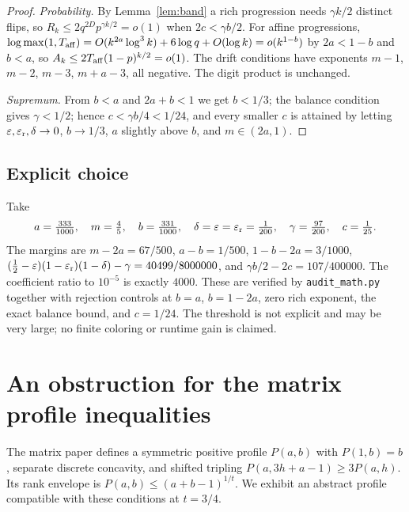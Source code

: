 \documentclass[11pt]{article}
\begin{document}
\begin{proof}
\emph{Probability.} By Lemma~\ref{lem:band} a rich progression needs
$\gamma k/2$ distinct flips, so
$R_k\le2q^{2D}p^{\gamma k/2}=o(1)$ when $2c<\gamma b/2$.
For affine progressions,
$\log\max(1,T_{\rm aff})=O(k^{2a}\log^3k)+6\log q+O(\log k)=o(k^{1-b})$
by $2a<1-b$ and $b<a$, so $A_k\le2T_{\rm aff}(1-p)^{k/2}=o(1)$.
The drift conditions have exponents $m-1$, $m-2$, $m-3$, $m+a-3$, all
negative. The digit product is unchanged.

\emph{Supremum.} From $b<a$ and $2a+b<1$ we get $b<1/3$; the balance
condition gives $\gamma<1/2$; hence $c<\gamma b/4<1/24$, and every
smaller $c$ is attained by letting $\varepsilon,\varepsilon_{\rm r},\delta\to0$,
$b\to1/3$, $a$ slightly above $b$, and $m\in(2a,1)$.
\end{proof}

\subsection{Explicit choice}
Take
\[
 a=\tfrac{333}{1000},\quad m=\tfrac45,\quad b=\tfrac{331}{1000},\quad
 \delta=\varepsilon=\varepsilon_{\rm r}=\tfrac1{200},\quad
 \gamma=\tfrac{97}{200},\quad c=\tfrac1{25}.
\]
The margins are $m-2a=67/500$, $a-b=1/500$, $1-b-2a=3/1000$,
$(\frac12-\varepsilon)(1-\varepsilon_{\rm r})(1-\delta)-\gamma=40499/8000000$,
and $\gamma b/2-2c=107/400000$. The coefficient ratio to $10^{-5}$ is
exactly $4000$. These are verified by \texttt{audit\_math.py} together
with rejection controls at $b=a$, $b=1-2a$, zero rich exponent, the
exact balance bound, and $c=1/24$. The threshold is not explicit and
may be very large; no finite coloring or runtime gain is claimed.

\section{An obstruction for the matrix profile inequalities}
The matrix paper defines a symmetric positive profile $P(a,b)$ with
$P(1,b)=b$, separate discrete concavity, and shifted tripling
$P(a,3h+a-1)\ge3P(a,h)$. Its rank envelope is
$P(a,b)\le(a+b-1)^{1/t}$. We exhibit an abstract profile compatible with
these conditions at $t=3/4$.
\end{document}
